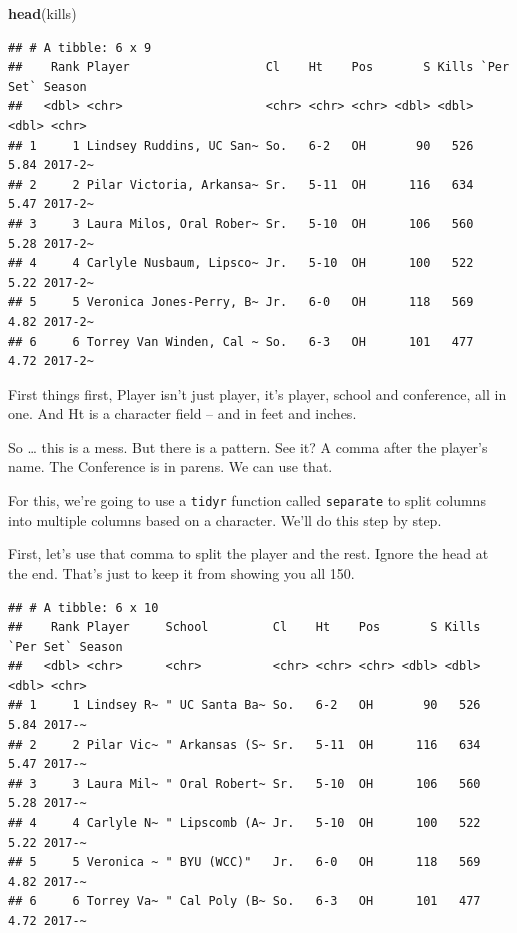 \documentclass[
]{book}
\newenvironment{Shaded}{\begin{snugshade}}{\end{snugshade}}
\newcommand{\DataTypeTok}[1]{\textcolor[rgb]{0.13,0.29,0.53}{#1}}
\newcommand{\KeywordTok}[1]{\textcolor[rgb]{0.13,0.29,0.53}{\textbf{#1}}}
\newcommand{\NormalTok}[1]{#1}
\newcommand{\OperatorTok}[1]{\textcolor[rgb]{0.81,0.36,0.00}{\textbf{#1}}}
\newcommand{\StringTok}[1]{\textcolor[rgb]{0.31,0.60,0.02}{#1}}
\begin{document}
\begin{Shaded}
\begin{Highlighting}[]
\KeywordTok{head}\NormalTok{(kills)}
\end{Highlighting}
\end{Shaded}

\begin{verbatim}
## # A tibble: 6 x 9
##    Rank Player                   Cl    Ht    Pos       S Kills `Per Set` Season 
##   <dbl> <chr>                    <chr> <chr> <chr> <dbl> <dbl>     <dbl> <chr>  
## 1     1 Lindsey Ruddins, UC San~ So.   6-2   OH       90   526      5.84 2017-2~
## 2     2 Pilar Victoria, Arkansa~ Sr.   5-11  OH      116   634      5.47 2017-2~
## 3     3 Laura Milos, Oral Rober~ Sr.   5-10  OH      106   560      5.28 2017-2~
## 4     4 Carlyle Nusbaum, Lipsco~ Jr.   5-10  OH      100   522      5.22 2017-2~
## 5     5 Veronica Jones-Perry, B~ Jr.   6-0   OH      118   569      4.82 2017-2~
## 6     6 Torrey Van Winden, Cal ~ So.   6-3   OH      101   477      4.72 2017-2~
\end{verbatim}

First things first, Player isn't just player, it's player, school and conference, all in one. And Ht is a character field -- and in feet and inches.

So \ldots{} this is a mess. But there is a pattern. See it? A comma after the player's name. The Conference is in parens. We can use that.

For this, we're going to use a \texttt{tidyr} function called \texttt{separate} to split columns into multiple columns based on a character. We'll do this step by step.

First, let's use that comma to split the player and the rest. Ignore the head at the end. That's just to keep it from showing you all 150.

\begin{Shaded}
\end{Shaded}

\begin{verbatim}
## # A tibble: 6 x 10
##    Rank Player     School         Cl    Ht    Pos       S Kills `Per Set` Season
##   <dbl> <chr>      <chr>          <chr> <chr> <chr> <dbl> <dbl>     <dbl> <chr> 
## 1     1 Lindsey R~ " UC Santa Ba~ So.   6-2   OH       90   526      5.84 2017-~
## 2     2 Pilar Vic~ " Arkansas (S~ Sr.   5-11  OH      116   634      5.47 2017-~
## 3     3 Laura Mil~ " Oral Robert~ Sr.   5-10  OH      106   560      5.28 2017-~
## 4     4 Carlyle N~ " Lipscomb (A~ Jr.   5-10  OH      100   522      5.22 2017-~
## 5     5 Veronica ~ " BYU (WCC)"   Jr.   6-0   OH      118   569      4.82 2017-~
## 6     6 Torrey Va~ " Cal Poly (B~ So.   6-3   OH      101   477      4.72 2017-~
\end{verbatim}
\end{document}
